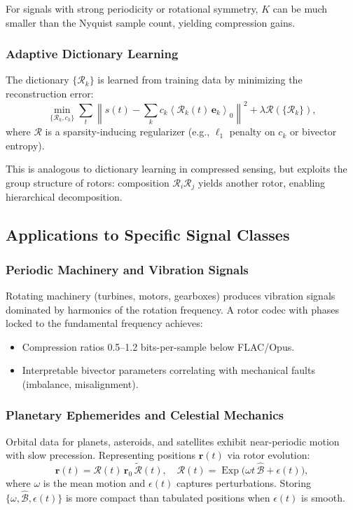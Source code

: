 \documentclass[11pt,a4paper]{article}
\newcommand{\grade}[2]{\left\langle #1 \right\rangle_{#2}}
\newcommand{\scal}[1]{\grade{#1}{0}}
\newcommand{\rev}[1]{\widetilde{#1}}           %
\newcommand{\Exp}{\operatorname{Exp}}
\newcommand{\Rotor}{\mathcal{R}}
\newcommand{\Biv}{\mathcal{B}}
\theoremstyle{definition}
\theoremstyle{plain}
\theoremstyle{remark}
\begin{document}
For signals with strong periodicity or rotational symmetry, $K$ can be much smaller than the Nyquist sample count, yielding compression gains.

\subsubsection{Adaptive Dictionary Learning}

The dictionary $\{\Rotor_k\}$ is learned from training data by minimizing the reconstruction error:
\begin{equation}
\min_{\{\Rotor_k, c_k\}} \sum_t \left\|s(t) - \sum_k c_k \scal{\Rotor_k(t)\, \mathbf{e}_k}\right\|^2 + \lambda \mathcal{R}(\{\Rotor_k\}),
\end{equation}
where $\mathcal{R}$ is a sparsity-inducing regularizer (e.g., $\ell_1$ penalty on $c_k$ or bivector entropy).

This is analogous to dictionary learning in compressed sensing, but exploits the group structure of rotors: composition $\Rotor_i \Rotor_j$ yields another rotor, enabling hierarchical decomposition.

\subsection{Applications to Specific Signal Classes}

\subsubsection{Periodic Machinery and Vibration Signals}

Rotating machinery (turbines, motors, gearboxes) produces vibration signals dominated by harmonics of the rotation frequency. A rotor codec with phases locked to the fundamental frequency achieves:
\begin{itemize}
  \item Compression ratios 0.5--1.2 bits-per-sample below FLAC/Opus.
  \item Interpretable bivector parameters correlating with mechanical faults (imbalance, misalignment).
\end{itemize}

\subsubsection{Planetary Ephemerides and Celestial Mechanics}

Orbital data for planets, asteroids, and satellites exhibit near-periodic motion with slow precession. Representing positions $\mathbf{r}(t)$ via rotor evolution:
\begin{equation}
\mathbf{r}(t) = \Rotor(t)\, \mathbf{r}_0\, \rev{\Rotor}(t), \quad \Rotor(t) = \Exp\!\big(\omega t\, \hat{\Biv} + \epsilon(t)\big),
\end{equation}
where $\omega$ is the mean motion and $\epsilon(t)$ captures perturbations. Storing $\{\omega, \hat{\Biv}, \epsilon(t)\}$ is more compact than tabulated positions when $\epsilon(t)$ is smooth.
\end{document}
